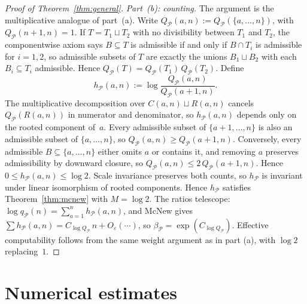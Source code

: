 \documentclass[11pt]{amsart}
\begin{document}
\begin{proof}[Proof of Theorem~\ref{thm:general}]
\medskip\noindent\textit{Part~\textup{(b)}: counting.}
The argument is the multiplicative analogue of part~(a). Write \(Q_{\mathcal{P}}(a,n):=Q_{\mathcal{P}}(\{a,\dots,n\})\), with \(Q_{\mathcal{P}}(n+1,n)=1\). If \(T=T_1\sqcup T_2\) with no divisibility between \(T_1\) and \(T_2\), the componentwise axiom says \(B\subseteq T\) is admissible if and only if \(B\cap T_i\) is admissible for \(i=1,2\), so admissible subsets of \(T\) are exactly the unions \(B_1\sqcup B_2\) with each \(B_i\subseteq T_i\) admissible. Hence \(Q_{\mathcal{P}}(T)=Q_{\mathcal{P}}(T_1)\,Q_{\mathcal{P}}(T_2)\). Define
\[
h_{\mathcal{P}}(a,n):=\log\frac{Q_{\mathcal{P}}(a,n)}{Q_{\mathcal{P}}(a+1,n)}.
\]
The multiplicative decomposition over \(C(a,n)\sqcup R(a,n)\) cancels \(Q_{\mathcal{P}}(R(a,n))\) in numerator and denominator, so \(h_{\mathcal{P}}(a,n)\) depends only on the rooted component of~\(a\). Every admissible subset of \(\{a+1,\dots,n\}\) is also an admissible subset of \(\{a,\dots,n\}\), so \(Q_{\mathcal{P}}(a,n)\ge Q_{\mathcal{P}}(a+1,n)\). Conversely, every admissible \(B\subseteq\{a,\dots,n\}\) either omits \(a\) or contains it, and removing \(a\) preserves admissibility by downward closure, so \(Q_{\mathcal{P}}(a,n)\le 2\,Q_{\mathcal{P}}(a+1,n)\). Hence \(0\le h_{\mathcal{P}}(a,n)\le\log 2\). Scale invariance preserves both counts, so \(h_{\mathcal{P}}\) is invariant under linear isomorphism of rooted components. Hence \(h_{\mathcal{P}}\) satisfies Theorem~\ref{thm:mcnew} with \(M=\log 2\). The ratios telescope: \(\log q_{\mathcal{P}}(n)=\sum_{a=1}^n h_{\mathcal{P}}(a,n)\), and McNew gives \(\sum h_{\mathcal{P}}(a,n)=C_{\log Q_{\mathcal{P}}}\,n+O_\varepsilon(\cdots)\), so \(\beta_{\mathcal{P}}=\exp(C_{\log Q_{\mathcal{P}}})\). Effective computability follows from the same weight argument as in part (a), with \(\log 2\) replacing~\(1\).
\end{proof}

\section{Numerical estimates}\label{sec:numerical}
\end{document}
